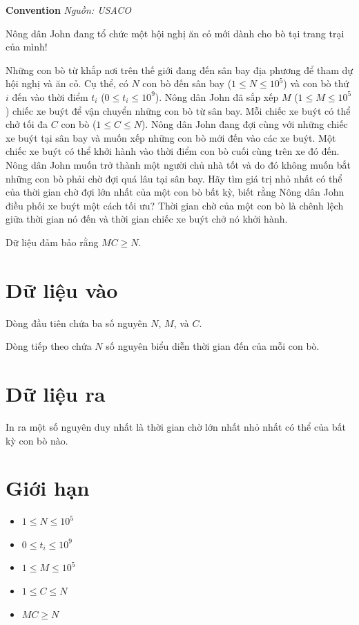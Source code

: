 \documentclass[12pt,a4paper]{article}
\newcommand{\problem}[2]{%
  \addcontentsline{toc}{section}{#1}%
  \begin{mdframed}[
    linecolor=framecolor,
    linewidth=1.5pt,
    backgroundcolor=white,
    topline=true, bottomline=true,
    leftline=true, rightline=true,
    innerleftmargin=10pt, innerrightmargin=10pt,
    innertopmargin=6pt, innerbottommargin=6pt,
  ]
  \textbf{\large #1} \hfill \textit{Nguồn: #2}
  \end{mdframed}
  \vspace{4pt}%
}
\begin{document}
\newpage







\problem{Convention}{USACO}

Nông dân John đang tổ chức một hội nghị ăn cỏ mới dành cho bò tại trang trại của mình!

Những con bò từ khắp nơi trên thế giới đang đến sân bay địa phương để tham dự hội nghị và ăn cỏ. Cụ thể, có $N$ con bò đến sân bay ($1 \le N \le 10^5$) và con bò thứ $i$ đến vào thời điểm $t_i$ ($0 \le t_i \le 10^9$). Nông dân John đã sắp xếp $M$ ($1 \le M \le 10^5$) chiếc xe buýt để vận chuyển những con bò từ sân bay. Mỗi chiếc xe buýt có thể chở tối đa $C$ con bò ($1 \le C \le N$). Nông dân John đang đợi cùng với những chiếc xe buýt tại sân bay và muốn xếp những con bò mới đến vào các xe buýt. Một chiếc xe buýt có thể khởi hành vào thời điểm con bò cuối cùng trên xe đó đến. Nông dân John muốn trở thành một người chủ nhà tốt và do đó không muốn bắt những con bò phải chờ đợi quá lâu tại sân bay. Hãy tìm giá trị nhỏ nhất có thể của thời gian chờ đợi lớn nhất của một con bò bất kỳ, biết rằng Nông dân John điều phối xe buýt một cách tối ưu? Thời gian chờ của một con bò là chênh lệch giữa thời gian nó đến và thời gian chiếc xe buýt chở nó khởi hành.

Dữ liệu đảm bảo rằng $MC \ge N$.

\section*{Dữ liệu vào}
Dòng đầu tiên chứa ba số nguyên $N$, $M$, và $C$.

Dòng tiếp theo chứa $N$ số nguyên biểu diễn thời gian đến của mỗi con bò.

\section*{Dữ liệu ra}
In ra một số nguyên duy nhất là thời gian chờ lớn nhất nhỏ nhất có thể của bất kỳ con bò nào.

\section*{Giới hạn}
\begin{constraintbox}
\begin{itemize}
    \item $1 \le N \le 10^5$
    \item $0 \le t_i \le 10^9$
    \item $1 \le M \le 10^5$
    \item $1 \le C \le N$
    \item $MC \ge N$
\end{itemize}
\end{constraintbox}
\end{document}
